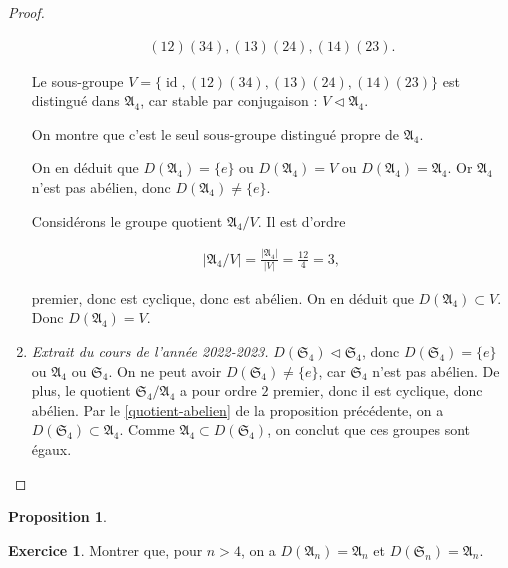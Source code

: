 \documentclass[french]{book}
\theoremstyle{definition}
\newtheorem{protoproposition}{Proposition}[section]
\newenvironment{prop}
    {\colorlet{shadecolor}{blue!5}\begin{shaded}\begin{protoproposition}}
    {\end{protoproposition}\end{shaded}}
\newtheorem{exo}{Exercice}
\newcommand{\biggg}{>}
\newcommand{\bg}{\biggg}
\begin{document}
\begin{proof}
\begin{enumerate}
    \begin{gather*}
      (1 2)(3 4), (1 3)(2 4), (1 4) (2 3).
    \end{gather*}

    Le sous-groupe \(V = \{ \operatorname{id},  (1 2)(3 4), (1 3)(2 4), (1 4) (2 3)\}\) est distingué dans \(\mathfrak{A}_4\), car stable par conjugaison : \(V \triangleleft \mathfrak{A}_4\).

    On montre que c'est le seul sous-groupe distingué propre de \(\mathfrak{A}_4\).

    On en déduit que \(D(\mathfrak{A}_4) = \{ e \}\) ou \(D(\mathfrak{A}_4) = V\) ou \(D(\mathfrak{A}_4) = \mathfrak{A}_4\). Or \(\mathfrak{A}_4\) n'est pas abélien, donc \(D(\mathfrak{A}_4) \neq \{ e \}\).

    Considérons le groupe quotient \(\mathfrak{A}_4 / V\). Il est d'ordre

    \begin{gather*}
      \left\lvert \mathfrak{A}_4/V \right\rvert = \frac{\left\lvert \mathfrak{A}_4 \right\rvert}{\left\lvert V \right\rvert} = \frac{12}{4}= 3,
    \end{gather*}

    premier, donc est cyclique, donc est abélien. On en déduit que \(D(\mathfrak{A}_4) \subset V\). Donc \(D(\mathfrak{A}_4) = V\).

    \item \emph{Extrait du cours de l'année 2022-2023.} \(D(\mathfrak{S}_{4}) \triangleleft \mathfrak{S}_{4}\), donc \(D(\mathfrak{S}_{4}) = \{ e \}\) ou \(\mathfrak{A}_{4}\) ou \(\mathfrak{S}_{4}\). On ne peut avoir \(D(\mathfrak{S}_{4}) \neq \{ e \}\), car \(\mathfrak{S}_{4}\) n'est pas abélien.
    De plus, le quotient \(\mathfrak{S}_{4}/\mathfrak{A}_{4}\) a pour ordre \(2\) premier, donc il est cyclique, donc abélien. Par le \ref{quotient-abelien} de la proposition précédente, on a \(D(\mathfrak{S}_{4}) \subset \mathfrak{A}_{4}\). Comme \(\mathfrak{A}_{4} \subset D(\mathfrak{S}_{4})\), on conclut que ces groupes sont égaux.
  \end{enumerate}
\end{proof}

\begin{prop}
  \begin{exo}
    Montrer que, pour \(n \bg 4\), on a \(D(\mathfrak{A}_n) = \mathfrak{A}_n\) et \(D(\mathfrak{S}_n) = \mathfrak{A}_n\).
  \end{exo}
\end{prop}
\end{document}
